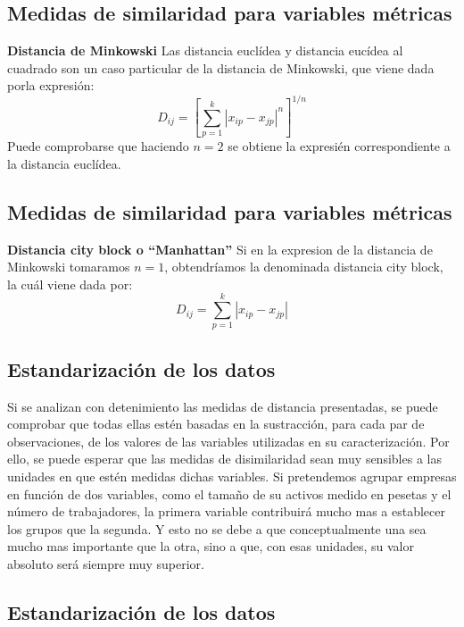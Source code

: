 \documentclass[]{article}
\begin{document}
\subsection{Medidas de similaridad para variables
métricas}\label{medidas-de-similaridad-para-variables-muxe9tricas-2}

 \textbf{Distancia de Minkowski} Las distancia euclídea y distancia
eucídea al cuadrado son un caso particular de la distancia de Minkowski,
que viene dada porla expresión:
\[D_{ij}=[\sum_{p=1}^{k}|x_{ip}-x_{jp}|^n]^{1/n}\] Puede comprobarse que
haciendo \(n = 2\) se obtiene la expresién correspondiente a la
distancia euclídea.

\subsection{Medidas de similaridad para variables
métricas}\label{medidas-de-similaridad-para-variables-muxe9tricas-3}

 \textbf{Distancia city block o ``Manhattan''} Si en la expresion de la
distancia de Minkowski tomaramos \(n = 1\), obtendríamos la denominada
distancia city block, la cuál viene dada por:
\[D_{ij}=\sum_{p=1}^{k}|x_{ip}-x_{jp}|\]

\subsection{Estandarización de los
datos}\label{estandarizaciuxf3n-de-los-datos}

 Si se analizan con detenimiento las medidas de distancia presentadas,
se puede comprobar que todas ellas estén basadas en la sustracción, para
cada par de observaciones, de los valores de las variables utilizadas en
su caracterización. Por ello, se puede esperar que las medidas de
disimilaridad sean muy sensibles a las unidades en que estén medidas
dichas variables. Si pretendemos agrupar empresas en función de dos
variables, como el tamaño de su activos medido en pesetas y el número de
trabajadores, la primera variable contribuirá mucho mas a establecer los
grupos que la segunda. Y esto no se debe a que conceptualmente una sea
mucho mas importante que la otra, sino a que, con esas unidades, su
valor absoluto será siempre muy superior.

\subsection{Estandarización de los
datos}\label{estandarizaciuxf3n-de-los-datos-1}
\end{document}
